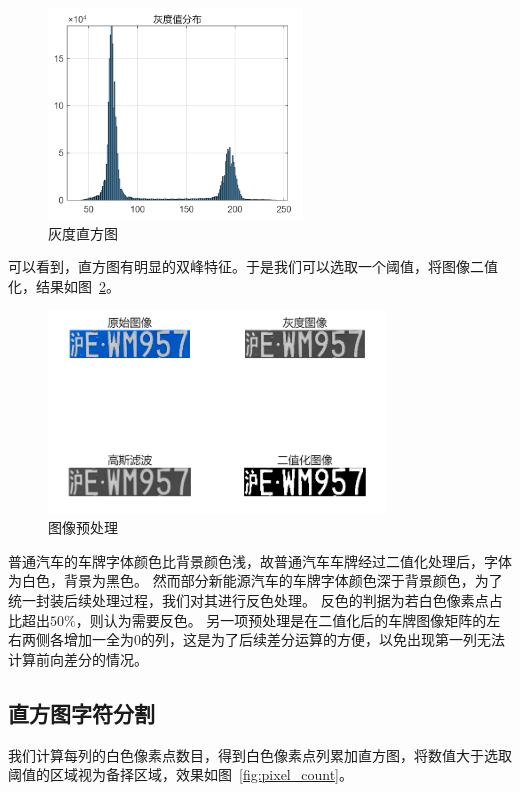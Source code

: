 \documentclass[utf8,a4paper]{ctexart}
\begin{document}
\begin{figure}[h]
    \centering
    \includegraphics[width=0.6\textwidth]{./img/easy/灰度阈值可视化.png}
    \caption{灰度直方图}
    \label{fig:hist}
\end{figure}

可以看到，直方图有明显的双峰特征。于是我们可以选取一个阈值，将图像二值化，结果如图~\ref{fig:preprocess}。

\begin{figure}[h]
    \centering
    \includegraphics[width=0.8\textwidth]{./img/easy/处理效果可视化.png}
    \caption{图像预处理}
    \label{fig:preprocess}
\end{figure}

普通汽车的车牌字体颜色比背景颜色浅，故普通汽车车牌经过二值化处理后，字体为白色，背景为黑色。
然而部分新能源汽车的车牌字体颜色深于背景颜色，为了统一封装后续处理过程，我们对其进行反色处理。
反色的判据为若白色像素点占比超出$50\%$，则认为需要反色。
另一项预处理是在二值化后的车牌图像矩阵的左右两侧各增加一全为$0$的列，这是为了后续差分运算的方便，以免出现第一列无法计算前向差分的情况。

\subsection{直方图字符分割}
我们计算每列的白色像素点数目，得到白色像素点列累加直方图，将数值大于选取阈值的区域视为备择区域，效果如图~\ref{fig:pixel_count}。
\end{document}
